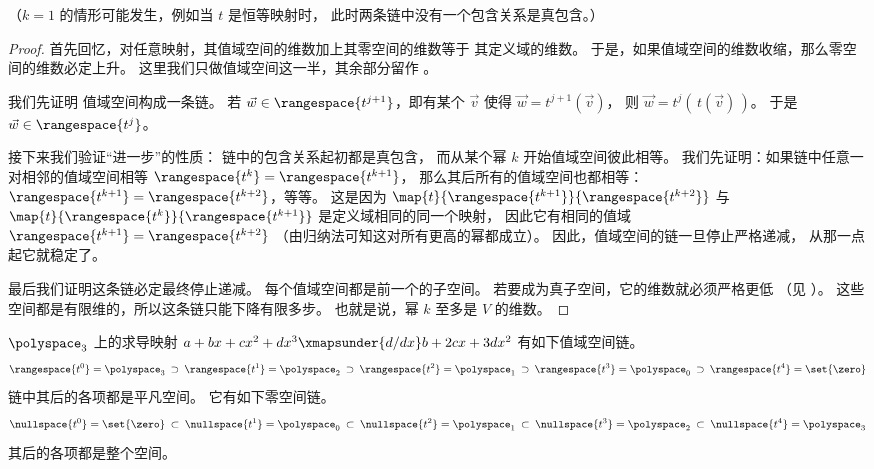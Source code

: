 \noindent （$k=1$ 的情形可能发生，例如当 $t$ 是恒等映射时，
此时两条链中没有一个包含关系是真包含。）

\begin{proof}
首先回忆，对任意映射，其值域空间的维数加上其零空间的维数等于
其定义域的维数。
于是，如果值域空间的维数收缩，那么零空间的维数必定上升。
这里我们只做值域空间这一半，其余部分留作
。

我们先证明
值域空间构成一条链。
若 $\vec{w}\in\rangespace{t^{j+1}}$，即有某个 $\vec{v}$ 使得
$\vec{w}=t^{j+1}(\vec{v})$，
则 $\vec{w}=t^{j}(\,t(\vec{v})\,)$。
于是 $\vec{w}\in\rangespace{t^{j}}$。

接下来我们验证“进一步”的性质：
链中的包含关系起初都是真包含，
而从某个幂 $k$ 开始值域空间彼此相等。
我们先证明：如果链中任意一对相邻的值域空间相等
\( \rangespace{t^{k}}=\rangespace{t^{k+1}} \)，
那么其后所有的值域空间也都相等：
\( \rangespace{t^{k+1}}=\rangespace{t^{k+2}} \)，等等。
这是因为
\( \map{t}{\rangespace{t^{k+1}}}{\rangespace{t^{k+2}}} \)
与
\( \map{t}{\rangespace{t^{k}}}{\rangespace{t^{k+1}}} \) 是定义域相同的同一个映射，
因此它有相同的值域
\( \rangespace{t^{k+1}}=\rangespace{t^{k+2}} \)
（由归纳法可知这对所有更高的幂都成立）。
因此，值域空间的链一旦停止严格递减，
从那一点起它就稳定了。

最后我们证明这条链必定最终停止递减。
每个值域空间都是前一个的子空间。
若要成为真子空间，它的维数就必须严格更低
（见 ）。
这些空间都是有限维的，所以这条链只能下降有限多步。
也就是说，幂 $k$ 至多是 $V$ 的维数。
\end{proof}

\begin{example}
$\polyspace_3$ 上的求导映射 $a+bx+cx^2+dx^3\xmapsunder{d/dx} b+2cx+3dx^2$
有如下值域空间链。
\begin{equation*}
  \rangespace{t^0}=\polyspace_3
    \:\supset\:\rangespace{t^1}=\polyspace_2
    \:\supset\:\rangespace{t^2}=\polyspace_1
    \:\supset\:\rangespace{t^3}=\polyspace_0
    \:\supset\:\rangespace{t^4}=\set{\zero}
\end{equation*}
链中其后的各项都是平凡空间。
它有如下零空间链。
\begin{equation*}
  \nullspace{t^0}=\set{\zero}
  \:\subset\: \nullspace{t^1}=\polyspace_0
  \:\subset\:\nullspace{t^2}=\polyspace_1
  \:\subset\:\nullspace{t^3}=\polyspace_2
  \:\subset\:\nullspace{t^4}=\polyspace_3
\end{equation*}
其后的各项都是整个空间。
\end{example}

